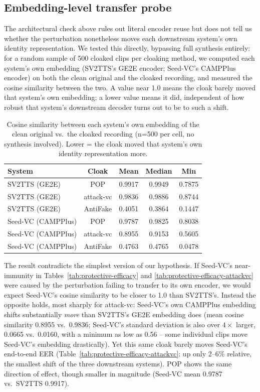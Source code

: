 \documentclass[11pt]{article}
\begin{document}
\subsection{Embedding-level transfer probe}
\label{sec:ablation-embedding-probe}
The architectural check above rules out literal encoder reuse but does
not tell us whether the perturbation nonetheless moves each downstream
system's own identity representation. We tested this directly,
bypassing full synthesis entirely: for a random sample of 500 cloaked
clips per cloaking method, we computed each system's own embedding
(SV2TTS's GE2E encoder; Seed-VC's CAMPPlus encoder) on both the clean
original and the cloaked recording, and measured the cosine similarity
between the two. A value near 1.0 means the cloak barely moved that
system's own embedding; a lower value means it did, independent of how
robust that system's downstream decoder turns out to be to such a
shift.

\begin{table}[H]
\centering
\caption{Cosine similarity between each system's own embedding of the
clean original vs.\ the cloaked recording (n=500 per cell, no synthesis
involved). Lower = the cloak moved that system's own identity
representation more.}
\label{tab:embedding-probe}
\begin{tabular}{lcccc}
\toprule
System & Cloak & Mean & Median & Min \\
\midrule
SV2TTS (GE2E)     & POP       & 0.9917 & 0.9949 & 0.7875 \\
SV2TTS (GE2E)     & attack-vc & 0.9836 & 0.9886 & 0.8744 \\
SV2TTS (GE2E)     & AntiFake  & 0.4051 & 0.3864 & 0.1447 \\
Seed-VC (CAMPPlus) & POP      & 0.9787 & 0.9825 & 0.8038 \\
Seed-VC (CAMPPlus) & attack-vc & 0.8955 & 0.9153 & 0.5605 \\
Seed-VC (CAMPPlus) & AntiFake  & 0.4763 & 0.4765 & 0.0478 \\
\bottomrule
\end{tabular}
\end{table}

The result contradicts the simplest version of our hypothesis. If
Seed-VC's near-immunity in Tables~\ref{tab:protective-efficacy} and
\ref{tab:protective-efficacy-attackvc} were caused by the perturbation
failing to transfer to its own encoder, we would expect Seed-VC's
cosine similarity to be closer to 1.0 than SV2TTS's. Instead the
opposite holds, most sharply for attack-vc: Seed-VC's own CAMPPlus
embedding shifts substantially \emph{more} than SV2TTS's GE2E embedding
does (mean cosine similarity 0.8955 vs.\ 0.9836; Seed-VC's standard
deviation is also over $4\times$ larger, 0.0665 vs.\ 0.0160, with a
minimum as low as 0.56 -- some individual clips move Seed-VC's
embedding drastically). Yet this same cloak barely moves Seed-VC's
end-to-end EER (Table~\ref{tab:protective-efficacy-attackvc}: up only
2--6\% relative, the smallest shift of the three downstream systems).
POP shows the same direction of effect, though smaller in magnitude
(Seed-VC mean 0.9787 vs.\ SV2TTS 0.9917).
\end{document}
